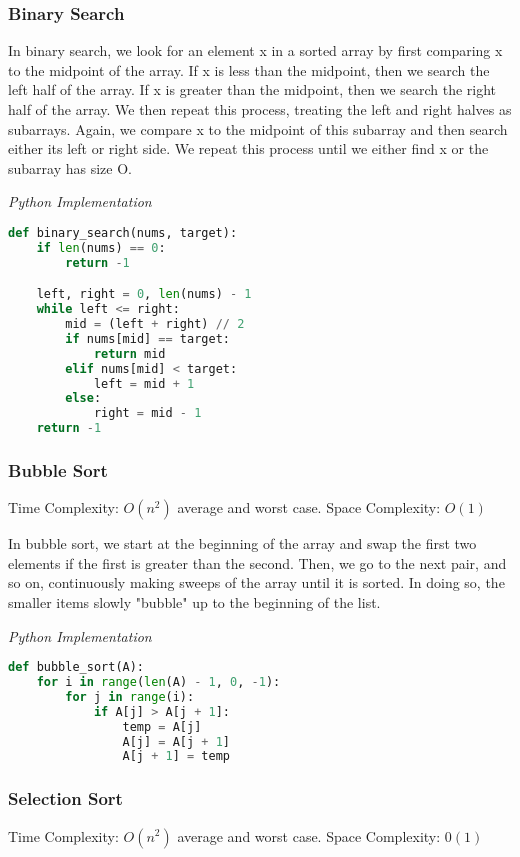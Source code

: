 \documentclass{article}
\begin{document}
    \subsubsection{Binary Search} 
    In binary search, we look for an element x in a sorted array by first comparing x to the midpoint of the array. If x is less than the midpoint, then we search the left half of the array. If x is greater than the midpoint, then we search the right half of the array. We then repeat this process, treating the left and right halves as subarrays. Again, we compare x to the midpoint of this subarray and then search either its left or right side. We repeat this process until we either find x or the subarray has size O.

\vspace{8pt} \emph{Python Implementation}
\begin{lstlisting}[language=Python]
def binary_search(nums, target):
    if len(nums) == 0:
        return -1

    left, right = 0, len(nums) - 1
    while left <= right:
        mid = (left + right) // 2
        if nums[mid] == target:
            return mid
        elif nums[mid] < target:
            left = mid + 1
        else:
            right = mid - 1
    return -1
\end{lstlisting}
    
    \subsubsection{Bubble Sort}
    Time Complexity: $O(n^2)$ average and worst case. Space Complexity: $O(1)$
     
    In bubble sort, we start at the beginning of the array and swap the first two elements if the first is greater than the second. Then, we go to the next pair, and so on, continuously making sweeps of the array until it is
    sorted. In doing so, the smaller items slowly "bubble" up to the beginning of the list. 

\vspace{8pt} \emph{Python Implementation}
\begin{lstlisting}[language=Python]
def bubble_sort(A):
    for i in range(len(A) - 1, 0, -1):
        for j in range(i):
            if A[j] > A[j + 1]:
                temp = A[j]
                A[j] = A[j + 1]
                A[j + 1] = temp
\end{lstlisting}
    \subsubsection{Selection Sort}
    Time Complexity: $O( n^2)$ average and worst case. Space Complexity: $0 (1)$
    
\end{document}

